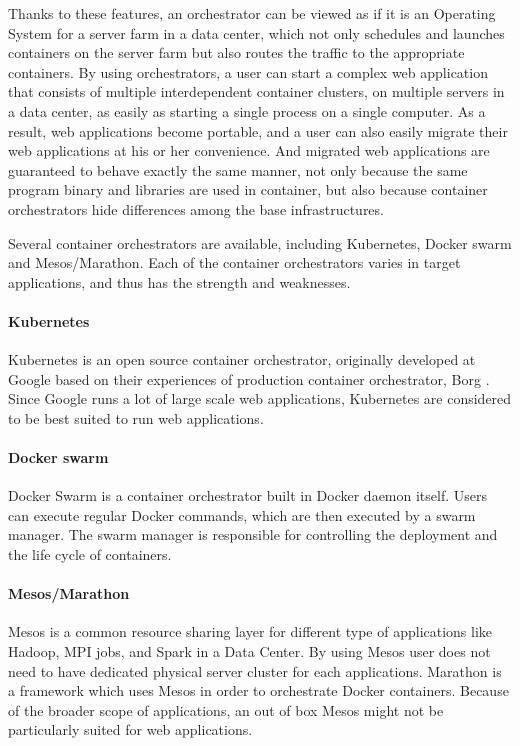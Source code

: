 Thanks to these features, an orchestrator can be viewed as if it is an Operating System for a server farm in a data center, which not only schedules and launches containers on the server farm but also routes the traffic to the appropriate containers.
By using orchestrators, a user can start a complex web application that consists of multiple interdependent container clusters, on multiple servers in a data center, as easily as starting a single process on a single computer.
As a result, web applications become portable, and a user can also easily migrate their web applications at his or her convenience.
And migrated web applications are guaranteed to behave exactly the same manner, not only because the same program binary and libraries are used in container, but also because container orchestrators hide differences among the base infrastructures.

Several container orchestrators are available, including Kubernetes, Docker swarm and Mesos/Marathon.
Each of the container orchestrators varies in target applications, and thus has the strength and weaknesses.

\paragraph{Kubernetes}
Kubernetes \cite{burns2016borg} is an open source container orchestrator, originally developed at Google based on their experiences of production container orchestrator, Borg \cite{Verma2015}. 
Since Google runs a lot of large scale web applications, Kubernetes are considered to be best suited to run web applications.

\paragraph{Docker swarm}
Docker Swarm is a container orchestrator built in Docker daemon itself.
Users can execute regular Docker commands, which are then executed by a swarm manager. 
The swarm manager is responsible for controlling the deployment and the life cycle of containers.

\paragraph{Mesos/Marathon}
Mesos \cite{hindman2011mesos} is a common resource sharing layer for different type of applications like Hadoop, MPI jobs, and Spark in a Data Center. 
By using Mesos user does not need to have dedicated physical server cluster for each applications.
Marathon is a framework which uses Mesos in order to orchestrate Docker containers.
Because of the broader scope of applications, an out of box Mesos might not be particularly suited for web applications.

